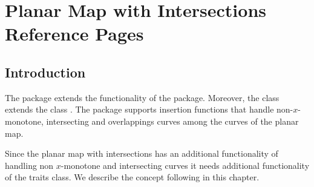 


\clearpage
\section{Planar Map with Intersections Reference Pages}

\subsection*{Introduction}

  The  package extends the
  functionality of the  package. Moreover, the class
   extends the class
  . The  package
  supports insertion functions that handle non-$x$-monotone,
  intersecting and overlappings curves among the curves of
  the planar map.

  Since the planar map with intersections has an additional
  functionality of handling non $x$-monotone and intersecting curves
  it needs additional functionality of the traits class. We describe
  the  concept following in
  this chapter. 



